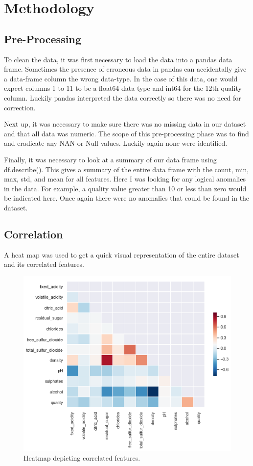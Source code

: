 \section{Methodology}

\subsection{Pre-Processing}

To clean the data, it was first necessary to load the data into a pandas data frame. Sometimes the presence of erroneous data in pandas can accidentally give a data-frame column the wrong data-type. In the case of this data, one would expect columns 1 to 11 to be a float64 data type and int64 for the 12th quality column. Luckily pandas interpreted the data correctly so there was no need for correction. 

Next up, it was necessary to make sure there was no missing data in our dataset and that all data was numeric. The scope of this pre-processing phase was to find and eradicate any NAN or Null values. Luckily again none were identified.

Finally, it was necessary to look at a summary of our data frame using df.describe(). This gives a summary of the entire data frame with the count, min, max, std, and mean for all features. Here I was looking for any logical anomalies in the data. For example, a quality value greater than 10 or less than zero would be indicated here. Once again there were no anomalies that could be found in the dataset. 

\subsection{Correlation}

A heat map was used to get a quick visual representation of the entire dataset and its correlated features.

\begin{figure}[H]
\centering
        \includegraphics[totalheight=8cm]{images/correlation.png}
    \caption{Heatmap depicting correlated features.}
    \label{fig:heatmap}
\end{figure}

